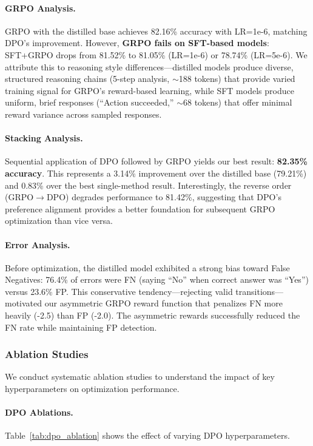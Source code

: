 \documentclass[11pt,a4paper]{article}
\begin{document}
\paragraph{GRPO Analysis.} GRPO with the distilled base achieves 82.16\% accuracy with LR=1e-6, matching DPO's improvement. However, \textbf{GRPO fails on SFT-based models}: SFT+GRPO drops from 81.52\% to 81.05\% (LR=1e-6) or 78.74\% (LR=5e-6). We attribute this to reasoning style differences---distilled models produce diverse, structured reasoning chains (5-step analysis, $\sim$188 tokens) that provide varied training signal for GRPO's reward-based learning, while SFT models produce uniform, brief responses (``Action succeeded,'' $\sim$68 tokens) that offer minimal reward variance across sampled responses.

\paragraph{Stacking Analysis.} Sequential application of DPO followed by GRPO yields our best result: \textbf{82.35\% accuracy}. This represents a 3.14\% improvement over the distilled base (79.21\%) and 0.83\% over the best single-method result. Interestingly, the reverse order (GRPO$\rightarrow$DPO) degrades performance to 81.42\%, suggesting that DPO's preference alignment provides a better foundation for subsequent GRPO optimization than vice versa.

\paragraph{Error Analysis.} Before optimization, the distilled model exhibited a strong bias toward False Negatives: 76.4\% of errors were FN (saying ``No'' when correct answer was ``Yes'') versus 23.6\% FP. This conservative tendency---rejecting valid transitions---motivated our asymmetric GRPO reward function that penalizes FN more heavily (-2.5) than FP (-2.0). The asymmetric rewards successfully reduced the FN rate while maintaining FP detection.

\subsubsection{Ablation Studies}

We conduct systematic ablation studies to understand the impact of key hyperparameters on optimization performance.

\paragraph{DPO Ablations.} Table~\ref{tab:dpo_ablation} shows the effect of varying DPO hyperparameters.
\end{document}
